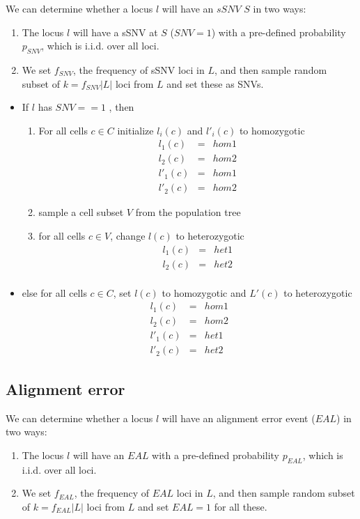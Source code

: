 \documentclass[a4paper,11pt]{article}
\begin{document}
We can determine whether a locus $l$ will have an $sSNV$ $S$ in two ways:
\begin{enumerate}
\item The locus $l$ will have a sSNV at $S$ ($SNV=1$) with a pre-defined probability $p_{SNV}$, which is i.i.d. over all loci.
\item We set $f_{SNV}$,  the frequency of sSNV loci in $L$, and then sample random subset of $k=f_{SNV}|L|$ loci from $L$ and set these as SNVs.
\end{enumerate}

\begin{itemize}
\item If  $l$ has $SNV==1$
  , then
  \begin{enumerate}
  \item For all cells $c\in C$ initialize $l_i(c)$ and $l'_i(c) $ to homozygotic
    \begin{eqnarray*}
      l_1(c) &=& hom1 \\
      l_2(c) &=& hom2 \\
      l'_1(c) &=& hom1 \\
      l'_2(c) &=& hom2 
    \end{eqnarray*}
  \item sample a cell subset $V$ from the population tree
  \item for all cells $c\in V$, change $l(c)$ to heterozygotic
    \begin{eqnarray*}
      l_1(c) &=& het1 \\
      l_2(c) &=& het2 \\
    \end{eqnarray*}
  \end{enumerate}
\item else for all cells $c\in C$, set $l(c)$ to homozygotic and $L'(c)$ to heterozygotic
  \begin{eqnarray*}
    l_1(c) &=& hom1 \\
    l_2(c) &=& hom2 \\
    l'_1(c) &=& het1 \\
    l'_2(c) &=& het2 
  \end{eqnarray*}
\end{itemize}


\subsection{Alignment error}
\label{sec:alignment-error}

We can determine whether a locus $l$ will have an alignment error event ($EAL$) in two ways:
\begin{enumerate}
\item The locus $l$ will have an $EAL$ with a pre-defined probability $p_{EAL}$, which is i.i.d. over all loci.
\item We set $f_{EAL}$, the frequency of $EAL$ loci in $L$, and then
  sample random subset of $k=f_{EAL}|L|$ loci from $L$ and set $EAL=1$
  for all these.
\end{enumerate}
\end{document}

